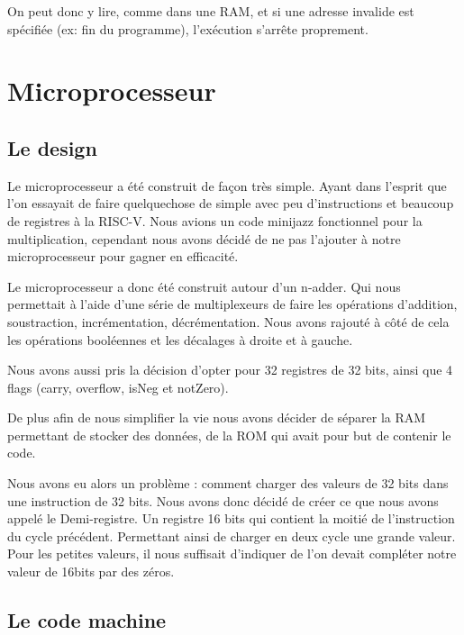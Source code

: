 \documentclass[10pt,a4paper,notitlepage ]{report}
\begin{document}
	On peut donc y lire, comme dans une RAM, et si une adresse invalide est spécifiée (ex: fin du programme), l'exécution s'arrête proprement.
	
	
	\section{Microprocesseur}

		\subsection{Le design}

		Le microprocesseur a été construit de façon très simple. Ayant dans l'esprit que l'on essayait de faire quelquechose de simple avec peu d'instructions et beaucoup de registres à la RISC-V. Nous avions un code minijazz fonctionnel pour la multiplication, cependant nous avons décidé de ne pas l'ajouter à notre microprocesseur pour gagner en efficacité.

		Le microprocesseur a donc été construit autour d'un n-adder. Qui nous permettait à l'aide d'une série de multiplexeurs de faire les opérations d'addition, soustraction, incrémentation, décrémentation. Nous avons rajouté à côté de cela les opérations booléennes et les décalages à droite et à gauche.

		Nous avons aussi pris la décision d'opter pour 32 registres de 32 bits, ainsi que 4 flags (carry, overflow, isNeg et notZero).

		De plus afin de nous simplifier la vie nous avons décider de séparer la RAM permettant de stocker des données, de la ROM qui avait pour but de contenir le code.

		Nous avons eu alors un problème : comment charger des valeurs de 32 bits dans une instruction de 32 bits. Nous avons donc décidé de créer ce que nous avons appelé le Demi-registre. Un registre 16 bits qui contient la moitié de l'instruction du cycle précédent. Permettant ainsi de charger en deux cycle une grande valeur. Pour les petites valeurs, il nous suffisait d'indiquer de l'on devait compléter notre valeur de 16bits par des zéros.

		\subsection{Le code machine}
\end{document}
